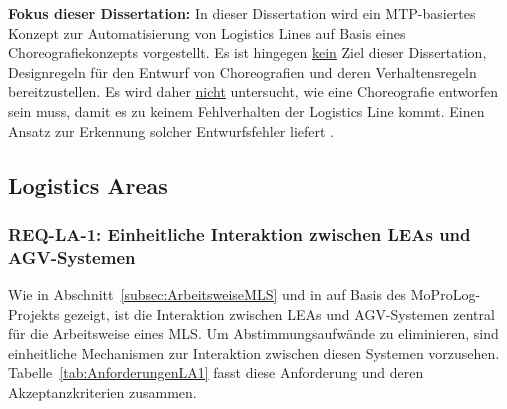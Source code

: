 \newpage

\begin{graybox}
	\textbf{Fokus dieser Dissertation:} In dieser Dissertation wird ein MTP-basiertes Konzept zur Automatisierung von Logistics Lines auf Basis eines Choreografiekonzepts vorgestellt. Es ist hingegen \underline{kein} Ziel dieser Dissertation, Designregeln für den Entwurf von Choreografien und deren Verhaltensregeln bereitzustellen. Es wird daher \underline{nicht} untersucht, wie eine Choreografie entworfen sein muss, damit es zu keinem Fehlverhalten der Logistics Line kommt. Einen Ansatz zur Erkennung solcher Entwurfsfehler liefert \cite{Bloch.2024}. 
\end{graybox}


\subsection{Logistics Areas}
\label{subsec:AnforderungenLA}

\subsubsection{REQ-LA-1: Einheitliche Interaktion zwischen LEAs und AGV-Systemen}

Wie in Abschnitt~\ref{subsec:ArbeitsweiseMLS} und in \cite{Blumenstein.INDIN,Blumenstein.MoProLog} auf Basis des MoProLog-Projekts gezeigt, ist die Interaktion zwischen LEAs und AGV-Systemen zentral für die Arbeitsweise eines MLS. Um Abstimmungsaufwände zu eliminieren, sind einheitliche Mechanismen zur Interaktion zwischen diesen Systemen vorzusehen. Tabelle~\ref{tab:AnforderungenLA1} fasst diese Anforderung und deren Akzeptanzkriterien zusammen.

